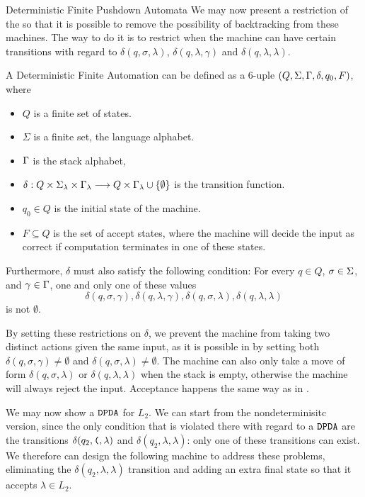 \begin{section}{Deterministic Finite Pushdown Automata}
	We may now present a restriction of the  so that
it is possible to remove the possibility of backtracking from these machines.
The way to do it is to restrict when the machine can have certain transitions
with regard to $\delta(q, \sigma, \lambda)$, $\delta(q, \lambda, \gamma)$ and
$\delta(q, \lambda, \lambda)$.

\begin{definition}
A Deterministic Finite Automation  can be defined as a 6-uple
$(Q, \Sigma, \Gamma, \delta, q_0, F)$, where
\begin{itemize}

\item $Q$ is a finite set of states.
\item $\Sigma$ is a finite set, the language alphabet.
\item $\Gamma$ is the stack alphabet,
\item $\delta:Q\times\Sigma_\lambda \times \Gamma_\lambda \longrightarrow Q \times \Gamma_\lambda \cup \{\emptyset \}$ is the transition function.
\item $q_0 \in Q$ is the initial state of the machine.
\item $F \subseteq Q$ is the set of accept states, where the machine will
decide the input as correct if computation terminates in one of these
states.
\end{itemize}

Furthermore, $\delta$ must also satisfy the following condition: For every $q \in Q$, $\sigma \in \Sigma$,
and $\gamma \in \Gamma$, one and only one of these values
$$\delta(q, \sigma, \gamma), \delta(q, \lambda, \gamma), \delta(q, \sigma, \lambda), \delta(q, \lambda, \lambda)$$
is not $\emptyset$.

\end{definition}

By setting these restrictions on $\delta$, we prevent the machine from taking two
distinct actions given the same input, as it is possible in 
by setting both $\delta(q, \sigma, \gamma) \neq \emptyset$ and
$\delta(q, \sigma, \lambda) \neq \emptyset$. The machine can also only take a
move of form $\delta(q, \sigma, \lambda)$ or $\delta(q, \lambda, \lambda)$ when
the stack is empty, otherwise the machine will always reject the input. Acceptance
happens the same way as in .

We may now show a $\texttt{DPDA}$ for $L_2$. We can start
from the nondeterminisitc version, since the only condition that is violated
there with regard to a $\texttt{DPDA}$ are the transitions
$\delta(q_2, \texttt{(}, \lambda)$ and $\delta(q_2, \lambda, \lambda)$: only one
of these transitions can exist. We therefore can design the following machine
to address these problems, eliminating the $\delta(q_2, \lambda, \lambda)$
transition and adding an extra final state so that it accepts $\lambda \in L_2$.


\end{section}
